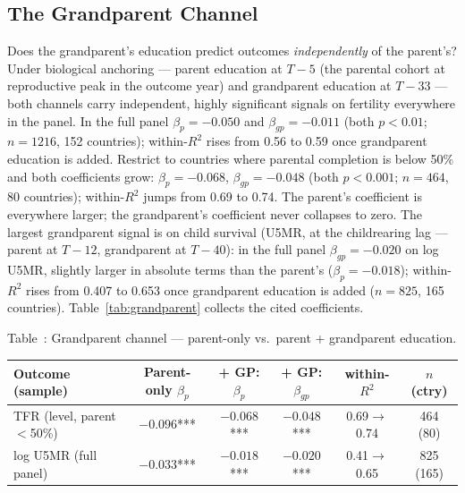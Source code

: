 \documentclass[12pt,letterpaper]{article}
\begin{document}
\subsection{The Grandparent Channel}\label{the-grandparent-channel}
Does the grandparent's education predict outcomes \emph{independently}
of the parent's? Under biological anchoring --- parent education at
$T-5$ (the parental cohort at reproductive peak in the outcome year)
and grandparent education at $T-33$ --- both channels carry
independent, highly significant signals on fertility everywhere in
the panel. In the full panel $\beta_p=-0.050$ and $\beta_{gp}=-0.011$
(both $p<0.01$; $n=1216$, 152 countries); within-$R^2$ rises from
0.56 to 0.59 once grandparent education is added. Restrict to
countries where parental completion is below 50\% and both
coefficients grow: $\beta_p=-0.068$, $\beta_{gp}=-0.048$ (both
$p<0.001$; $n=464$, 80 countries); within-$R^2$ jumps from 0.69 to
0.74. The parent's coefficient is everywhere larger; the
grandparent's coefficient never collapses to zero. The largest
grandparent signal is on child survival (U5MR, at the childrearing
lag --- parent at $T{-}12$, grandparent at $T{-}40$): in the full
panel $\beta_{gp}=-0.020$ on log U5MR, slightly larger in absolute
terms than the parent's ($\beta_p=-0.018$); within-$R^2$
rises from 0.407 to 0.653 once grandparent education is added
($n=825$, 165 countries). Table~\ref{tab:grandparent} collects the
cited coefficients.

\label{tab:grandparent}Table~\thetable: Grandparent channel --- parent-only vs.\ parent + grandparent education.

{\footnotesize\setlength{\tabcolsep}{3pt}
\begin{longtable}[]{@{}lccccc@{}}
\toprule
Outcome (sample) & Parent-only $\beta_p$ & + GP: $\beta_p$ & + GP: $\beta_{gp}$ & within-$R^2$ & $n$ (ctry) \\
\midrule
\endhead
TFR (level, parent $<$50\%) & $-0.096$*** & $-0.068$*** & $-0.048$*** & 0.69$\to$0.74 & 464 (80) \\
log U5MR (full panel)       & $-0.033$*** & $-0.018$*** & $-0.020$*** & 0.41$\to$0.65 & 825 (165) \\
\bottomrule
\end{longtable}}\addtocounter{table}{-1}%
\end{document}
